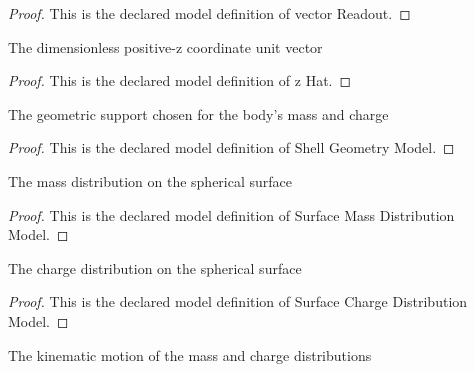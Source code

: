 \begin{proof}
  This is the declared model definition of vector Readout.
\end{proof}
\begin{definition}[z Hat]
  \label{def:physics:phyx-mini-0970:phyxminiproblems-problemphyxmini0970-zhat}
  The dimensionless positive-z coordinate unit vector
\end{definition}
\begin{proof}
  This is the declared model definition of z Hat.
\end{proof}
\begin{definition}
  \label{def:physics:phyx-mini-0970:phyxminiproblems-problemphyxmini0970-shellgeometrymodel}
  The geometric support chosen for the body's mass and charge
\end{definition}
\begin{proof}
  This is the declared model definition of Shell Geometry Model.
\end{proof}
\begin{definition}
  \label{def:physics:phyx-mini-0970:phyxminiproblems-problemphyxmini0970-surfacemassdistributionmodel}
  The mass distribution on the spherical surface
\end{definition}
\begin{proof}
  This is the declared model definition of Surface Mass Distribution Model.
\end{proof}
\begin{definition}
  \label{def:physics:phyx-mini-0970:phyxminiproblems-problemphyxmini0970-surfacechargedistributionmodel}
  The charge distribution on the spherical surface
\end{definition}
\begin{proof}
  This is the declared model definition of Surface Charge Distribution Model.
\end{proof}
\begin{definition}
  \label{def:physics:phyx-mini-0970:phyxminiproblems-problemphyxmini0970-rotationmodel}
  The kinematic motion of the mass and charge distributions
\end{definition}
